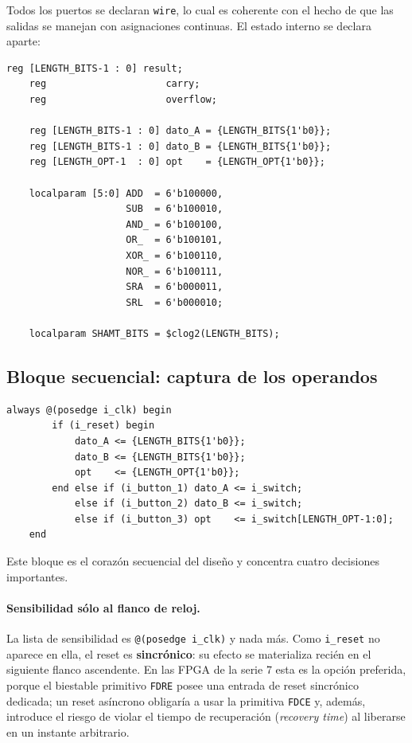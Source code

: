 \documentclass[12pt,a4paper]{article}
\begin{document}
Todos los puertos se declaran \texttt{wire}, lo cual es coherente con el hecho de que las
salidas se manejan con asignaciones continuas. El estado interno se declara aparte:

\begin{lstlisting}[caption={Señales internas y codificación de las operaciones.},label={lst:regs}]
    reg [LENGTH_BITS-1 : 0] result;
    reg                     carry;
    reg                     overflow;

    reg [LENGTH_BITS-1 : 0] dato_A = {LENGTH_BITS{1'b0}};
    reg [LENGTH_BITS-1 : 0] dato_B = {LENGTH_BITS{1'b0}};
    reg [LENGTH_OPT-1  : 0] opt    = {LENGTH_OPT{1'b0}};

    localparam [5:0] ADD  = 6'b100000,
                     SUB  = 6'b100010,
                     AND_ = 6'b100100,
                     OR_  = 6'b100101,
                     XOR_ = 6'b100110,
                     NOR_ = 6'b100111,
                     SRA  = 6'b000011,
                     SRL  = 6'b000010;

    localparam SHAMT_BITS = $clog2(LENGTH_BITS);
\end{lstlisting}

\subsection{Bloque secuencial: captura de los operandos}

\begin{lstlisting}[caption={Registros de entrada con reset sincrónico y carga por prioridad.},label={lst:seq}]
    always @(posedge i_clk) begin
        if (i_reset) begin
            dato_A <= {LENGTH_BITS{1'b0}};
            dato_B <= {LENGTH_BITS{1'b0}};
            opt    <= {LENGTH_OPT{1'b0}};
        end else if (i_button_1) dato_A <= i_switch;
            else if (i_button_2) dato_B <= i_switch;
            else if (i_button_3) opt    <= i_switch[LENGTH_OPT-1:0];
    end
\end{lstlisting}

Este bloque es el corazón secuencial del diseño y concentra cuatro decisiones importantes.

\paragraph{Sensibilidad sólo al flanco de reloj.} La lista de sensibilidad es
\texttt{@(posedge i\_clk)} y nada más. Como \texttt{i\_reset} no aparece en ella, el reset
es \textbf{sincrónico}: su efecto se materializa recién en el siguiente flanco ascendente.
En las FPGA de la serie 7 esta es la opción preferida, porque el biestable primitivo
\texttt{FDRE} posee una entrada de reset sincrónico dedicada; un reset asíncrono obligaría
a usar la primitiva \texttt{FDCE} y, además, introduce el riesgo de violar el tiempo de
recuperación (\textit{recovery time}) al liberarse en un instante arbitrario.
\end{document}

